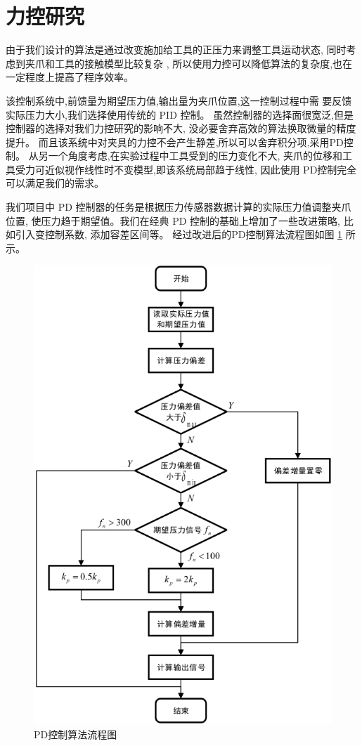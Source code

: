 \section{力控研究}
由于我们设计的算法是通过改变施加给工具的正压力来调整工具运动状态,
同时考虑到夹爪和工具的接触模型比较复杂 \cite{ref11} ,
所以使用力控可以降低算法的复杂度,也在一定程度上提高了程序效率。

该控制系统中,前馈量为期望压力值,输出量为夹爪位置,这一控制过程中需
要反馈实际压力大小,我们选择使用传统的 PID 控制。
虽然控制器的选择面很宽泛,但是控制器的选择对我们力控研究的影响不大,
没必要舍弃高效的算法换取微量的精度提升。
而且该系统中对夹具的力控不会产生静差,所以可以舍弃积分项,采用PD控制。
从另一个角度考虑,在实验过程中工具受到的压力变化不大,
夹爪的位移和工具受力可近似视作线性时不变模型,即该系统局部趋于线性,
因此使用 PD控制完全可以满足我们的需求。

我们项目中 PD 控制器的任务是根据压力传感器数据计算的实际压力值调整夹爪位置,
使压力趋于期望值。我们在经典 PD 控制的基础上增加了一些改进策略,
比如引入变控制系数, 添加容差区间等。
经过改进后的PD控制算法流程图如图 \ref{fig:3-3} 所示。

\begin{figure}[!ht]
  \centering
  \includegraphics[scale=0.6]{chapter03/pic/3-3}
  \caption{PD控制算法流程图}
  \label{fig:3-3}
  \vspace{-0.3cm}
\end{figure}

